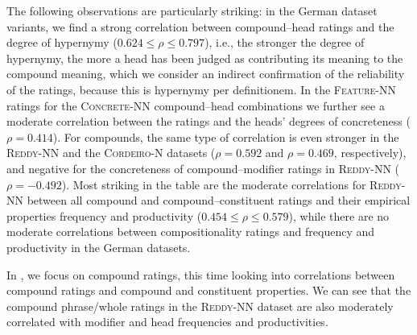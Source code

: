 \documentclass[output=paper,colorlinks,citecolor=brown]{langscibook}
\begin{document}
The following observations are particularly striking: in the German dataset variants, we find a strong correlation between compound--head ratings and the degree of hypernymy ($0.624 \le \rho \le 0.797$), i.e., the stronger the degree of hypernymy, the more a head has been judged as contributing its meaning to the compound meaning, which we consider an indirect confirmation of the reliability of the ratings, because this is hypernymy per definitionem. In the \textsc{Feature-NN} ratings for the \textsc{Concrete-NN} compound--head combinations we further see a moderate correlation between the ratings and the heads' degrees of concreteness ($\rho=0.414$). For compounds, the same type of correlation is even stronger in the \textsc{Reddy-NN} and the \textsc{Cordeiro-N} datasets ($\rho=0.592$ and $\rho=0.469$, respectively), and negative for the concreteness of compound--modifier ratings in \textsc{Reddy-NN} ($\rho=-0.492$). Most striking in the table are the moderate correlations for \textsc{Reddy-NN} between all compound and compound--constituent ratings and their empirical properties frequency and productivity ($0.454 \le \rho \le 0.579$), while there are no moderate correlations between compositionality ratings and frequency and productivity in the German datasets.

In , we focus on compound ratings, this time looking into correlations between compound ratings and compound and constituent properties. We can see that the compound phrase/whole ratings in the \textsc{Reddy-NN} dataset are also moderately correlated with modifier and head frequencies and productivities.
\end{document}
